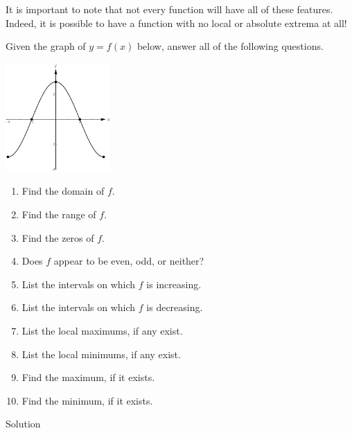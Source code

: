 It is  important to note that not every function will have all of these features.  Indeed, it is possible to have a function with no local or absolute extrema at all! 


\ifvc
\begin{example}
	Given the graph of $y = f(x)$ below, answer all of the following questions.
	\begin{center}
		\includegraphics[width=0.3\textwidth]{fig_functions_21}
	\end{center}
	
	\begin{enumerate}
		
		\item  Find the domain of $f$.
		
		\item  Find the range of $f$.
		
		\item  Find the zeros of $f$.
		
		\item  Does $f$ appear to be even, odd, or neither?
		
		\item  List the intervals on which $f$ is increasing.
		
		\item  List the intervals on which $f$ is decreasing.
		
		\item  List the local maximums, if any exist.
		
		\item  List the local minimums, if any exist.
		
		
		\item  Find the maximum, if it exists.
		
		\item  Find the minimum, if it exists.
		
	\end{enumerate}
	
	
	Solution 
	
	\begin{enumerate}
		

\end{enumerate}
\end{example}
